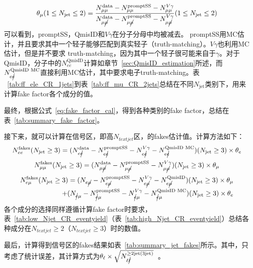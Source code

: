 \begin{equation}
\theta_{\mu}(1\leq N_{\text{jet}}\leq 2)=\frac{N_{\mu\mu}^{\text{data}}-N_{\mu\mu}^{\text{promptSS}}-N_{\mu\mu}^{V\gamma}}{N_{\mu\cancel{\mu}}^{\text{data}}-N_{\mu\cancel{\mu}}^{\text{promptSS}}-N_{\mu\cancel{\mu}}^{V\gamma}}(1\leq N_{\text{jet}}\leq 2)
\label{eq:fake_factor_cal}
\end{equation}
可以看到，promptSS，QmisID和$V\gamma$在分子分母中均被减去。
promptSS用MC估计，并且要求其中一个轻子能够匹配到真实轻子（truth-matching）。$V\gamma$也利用MC估计，但是并不要求
truth-matching，因为其中一个轻子很可能来自于$\gamma$。对于QmisID，分子中的$N_{ee}^{\text{QmisID}}$计算如章节~\ref{sec:QmisID_estimation}所述，而$N_{e\cancel{e}}^{\text{QmisID MC}}$直接利用MC估计，其中要求电子truth-matching。表
~\ref{tab:ff_ele_CR_1jets}到表~\ref{tab:ff_mu_CR_2jets}总结在不同$N_{\text{jet}}$类别下，用来计算fake factor各个成分的值。


最终，根据公式~\ref{eq:fake_factor_cal}，得到各种类别的fake factor，总结在表~\ref{tab:summary_fake_factor}。

接下来，就可以计算在信号区，即高$N_{text{jet}}$区，的fakes估计值。计算方法如下：
\begin{equation}
N_{ee}^{\text{fakes}}(N_{\text{jet}}\geq 3)=(N_{e\cancel{e}}^{\text{data}}-N_{e\cancel{e}}^{\text{promptSS}}-N_{e\cancel{e}}^{V\gamma}-N_{e\cancel{e}}^{\text{QmisID MC}})(N_{\text{jet}}\geq 3)\times \theta_{e}
\end{equation}
\begin{equation}
N_{\mu\mu}^{\text{fakes}}(N_{\text{jet}}\geq 3)=(N_{\mu\cancel{\mu}}^{\text{data}}-N_{\mu\cancel{\mu}}^{\text{promptSS}}-N_{\mu\cancel{\mu}}^{V\gamma})(N_{\text{jet}}\geq 3)\times \theta_{\mu}
\end{equation}
\begin{equation}
\begin{split}
N_{e\mu}^{\text{fakes}}(N_{\text{jet}}\geq 3)=(N_{e\cancel{\mu}}-N_{e\cancel{\mu}}^{\text{promptSS}}-N_{e\cancel{\mu}}^{V\gamma}-N_{e\cancel{\mu}}^{\text{QmisID}})(N_{\text{jet}}\geq 3)\times \theta_{\mu} \\ +
       (N_{\cancel{e}\mu}-N_{\cancel{e}\mu}^{\text{promptSS}}-N_{\cancel{e}\mu}^{V\gamma}-N_{\cancel{e}\mu}^{\text{QmisID MC}})(N_{\text{jet}}\geq 3)\times \theta_{e}
\end{split}
\end{equation}
各个成分的选择同样遵循计算fake factor时要求，表~\ref{tab:low_Njet_CR_eventyield}（表~\ref{tab:high_Njet_CR_eventyield}）总结各种成分在$N_{text{jet}}\ge2$（$N_{text{jet}}\ge3$）时的数值。


最后，计算得到信号区的fakes结果如表~\ref{tab:summary_jet_fakes}所示。其中，只考虑了统计误差，其计算方式为$\theta_{\ell}\times \sqrt{N_{\ell\cancel{\ell}}^{\geq \text{2jet(3jet)}}}$~\cite{Alison2015}。


